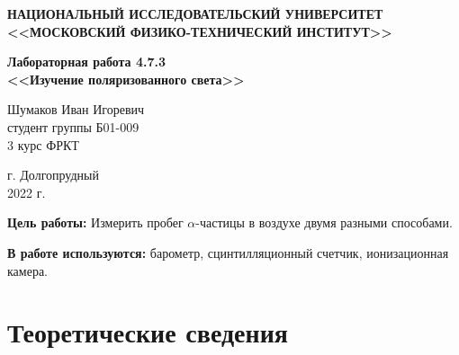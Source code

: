 \documentclass[a4paper,12pt]{article} %
\begin{document}
	
	
	\begin{center}
		
		\textbf{НАЦИОНАЛЬНЫЙ ИССЛЕДОВАТЕЛЬСКИЙ УНИВЕРСИТЕТ \\ <<МОСКОВСКИЙ ФИЗИКО-ТЕХНИЧЕСКИЙ ИНСТИТУТ>>}
		\vspace{13ex}
		
		\textbf{Лабораторная работа 4.7.3\\ <<Изучение поляризованного света>>}
		\vspace{40ex}
		
		\normalsize{Шумаков Иван Игоревич \\ студент группы Б01-009\\ 3 курс ФРКТ\\}
	\end{center}
	
	\vfill 
	
	\begin{center}
		г. Долгопрудный\\ 
		2022 г.
	\end{center}
	
	
	\thispagestyle{empty} %
	\newpage


    \textbf{Цель работы:} Измерить пробег $\alpha$-частицы в воздухе двумя разными способами.\par
    \textbf{В работе используются:} барометр, сцинтилляционный счетчик, ионизационная камера.\par
    
    
    \section{Теоретические сведения}
\end{document}
